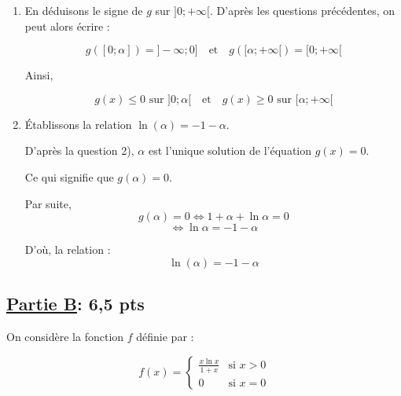 \documentclass[12pt,a4paper]{article}
\begin{document}
\begin{enumerate}
Donc, d'après le corollaire du théorème des valeurs intermédiaires, il existe $\beta \in ]0.2 ; 0.3[$ solution de l'équation $g(x) = 0$.\\
L'unique solution de cette équation est le réel $\alpha$.\\

Par conséquent, $\alpha = \beta$. D'où, $\alpha \in ]0.2 ; 0.3[$.

\item En déduisons le signe de $g$ sur $]0 ; +\infty[$.
D'après les questions précédentes, on peut alors écrire :

\[
g([0 ; \alpha]) = ]-\infty ; 0] \quad \text{et} \quad g([ \alpha ; +\infty[) = [0 ; +\infty[
\]

Ainsi,

\[
g(x) \leq 0 \text{ sur } ]0 ; \alpha[ \quad \text{et} \quad g(x) \geq 0 \text{ sur } [ \alpha ; +\infty[
\]

\item  Établissons la relation $\ln(\alpha) = -1 - \alpha$.

D'après la question 2), $\alpha$ est l'unique solution de l'équation $g(x) = 0$.

Ce qui signifie que $g(\alpha) = 0$.

Par suite,
\[
g(\alpha) = 0 \iff 1 + \alpha + \ln \alpha = 0
\]
\[
\iff \ln \alpha = -1 - \alpha
\]

D'où, la relation :
\[
\ln(\alpha) = -1 - \alpha
\]

\end{enumerate}
\subsection*{\underline{\textbf{Partie B}}:\textbf{ 6,5 pts}}
On considère la fonction $f$ définie par :

\[
f(x) = 
\begin{cases}
\frac{x \ln x}{1 + x} & \text{si } x > 0 \\
0 & \text{si } x = 0
\end{cases}
\]
\end{document}
